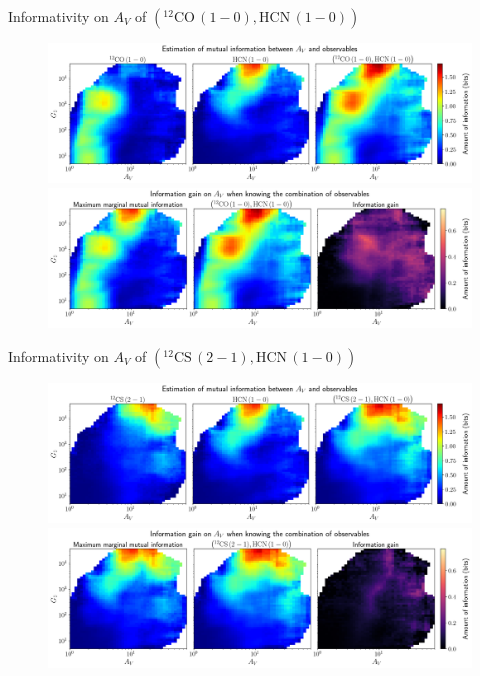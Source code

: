 \documentclass{beamer}
\begin{document}
\begin{frame}{Informativity on $A_V$ of $\left(\mathrm{^{12}CO\,(1-0)},\mathrm{HCN\,(1-0)}\right)$}
    \begin{figure}
        \centering
        \includegraphics[width=0.95\linewidth]{../mi/av__12co10_hcn10_mi.png}
        \vfill
        \includegraphics[width=0.95\linewidth]{../mi/av__12co10_hcn10_mi_gain.png}
    \end{figure}
\end{frame}

\begin{frame}{Informativity on $A_V$ of $\left(\mathrm{^{12}CS\,(2-1)},\mathrm{HCN\,(1-0)}\right)$}
    \begin{figure}
        \centering
        \includegraphics[width=0.95\linewidth]{../mi/av__12cs21_hcn10_mi.png}
        \vfill
        \includegraphics[width=0.95\linewidth]{../mi/av__12cs21_hcn10_mi_gain.png}
    \end{figure}
\end{frame}
\end{document}
